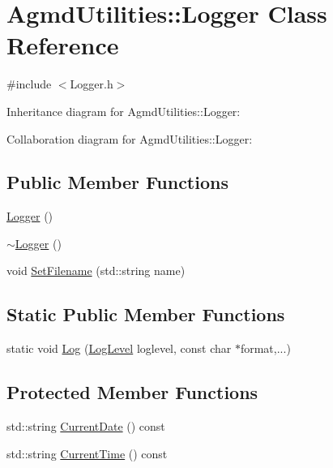 \hypertarget{class_agmd_utilities_1_1_logger}{\section{Agmd\+Utilities\+:\+:Logger Class Reference}
\label{class_agmd_utilities_1_1_logger}
}


{\ttfamily \#include $<$Logger.\+h$>$}



Inheritance diagram for Agmd\+Utilities\+:\+:Logger\+:


Collaboration diagram for Agmd\+Utilities\+:\+:Logger\+:
\subsection*{Public Member Functions}
\begin{DoxyCompactItemize}
\item 
\hyperlink{class_agmd_utilities_1_1_logger_a8af6a5f07c789cfe024d1b8340bee575}{Logger} ()
\item 
\hyperlink{class_agmd_utilities_1_1_logger_a28ed0b369d53914a410734ce5862b8ea}{$\sim$\+Logger} ()
\item 
void \hyperlink{class_agmd_utilities_1_1_logger_aa1c8b53d5a824a45319701ea57a3d69c}{Set\+Filename} (std\+::string name)
\end{DoxyCompactItemize}
\subsection*{Static Public Member Functions}
\begin{DoxyCompactItemize}
\item 
static void \hyperlink{class_agmd_utilities_1_1_logger_adb08cbeabef52efee204bf2a4a929570}{Log} (\hyperlink{namespace_agmd_utilities_a29e36cc332c9462e3dffc7c2e6b27645}{Log\+Level} loglevel, const char $\ast$format,...)
\end{DoxyCompactItemize}
\subsection*{Protected Member Functions}
\begin{DoxyCompactItemize}
\item 
std\+::string \hyperlink{class_agmd_utilities_1_1_logger_aba9179cf1bf26dc9306c3487b4d84c81}{Current\+Date} () const 
\item 
std\+::string \hyperlink{class_agmd_utilities_1_1_logger_a8b99fbad2c10c9840649ff2ccc6d780a}{Current\+Time} () const 
\end{DoxyCompactItemize}


